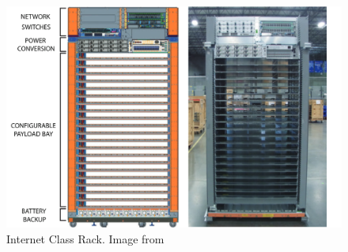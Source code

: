 \begin{figure} [!h]
\centering
\includegraphics[scale=.5]{methodology/images/goog_rack.png}
\caption[Example Hyper Scale]{Internet Class Rack. Image from \cite{barroso18}}
\label{goog_rack}
\end{figure}